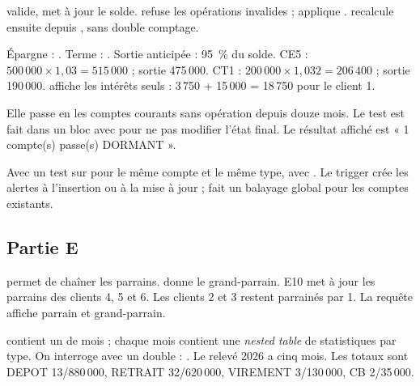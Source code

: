 { valide,  met à jour le solde.}
{ refuse les opérations invalides ;
 applique .
 recalcule ensuite depuis , sans double
comptage.}

{Épargne : . Terme :
. Sortie anticipée : 95~\% du solde.}
{CE5 : $500\,000 \times 1,03 = 515\,000$ ; sortie 475\,000. CT1 :
$200\,000 \times 1,032 = 206\,400$ ; sortie 190\,000.
 affiche les intérêts seuls : 3\,750 + 15\,000 =
18\,750 pour le client 1.}

{Elle passe en  les comptes courants  sans opération
depuis douze mois.}
{Le test est fait dans un bloc avec  pour ne pas modifier
l'état final. Le résultat affiché est « 1 compte(s) passe(s) DORMANT ».}

{Avec un test  sur  pour le même compte et le
même type, avec .}
{Le trigger  crée les alertes à l'insertion ou à la
mise à jour ;  fait un balayage global pour les comptes
existants.}

\subsection{Partie E}

{ permet de chaîner les parrains.
 donne le grand-parrain.}
{E10 met à jour les parrains des clients 4, 5 et 6. Les clients 2 et 3 restent
parrainés par 1. La requête affiche parrain et grand-parrain.}

{ contient un  de mois ; chaque mois contient
une \emph{nested table} de statistiques par type.}
{On interroge avec un double  :
. Le relevé 2026 a cinq mois. Les
totaux sont DEPOT 13/880\,000, RETRAIT 32/620\,000, VIREMENT 3/130\,000,
CB 2/35\,000.}


